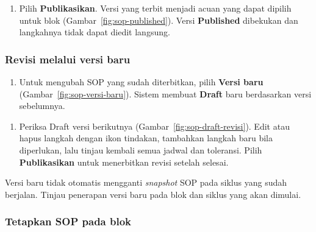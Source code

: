 
\begin{enumerate}[resume=admin-sop]
  \item Pilih \textbf{Publikasikan}. Versi yang terbit menjadi acuan yang dapat dipilih untuk blok (Gambar~\ref{fig:sop-published}). Versi \textbf{Published} dibekukan dan langkahnya tidak dapat diedit langsung.
\end{enumerate}


\subsubsection{Revisi melalui versi baru}

\begin{enumerate}[resume=admin-sop]
  \item Untuk mengubah SOP yang sudah diterbitkan, pilih \textbf{Versi baru} (Gambar~\ref{fig:sop-versi-baru}). Sistem membuat \textbf{Draft} baru berdasarkan versi sebelumnya.
\end{enumerate}


\begin{enumerate}[resume=admin-sop]
  \item Periksa Draft versi berikutnya (Gambar~\ref{fig:sop-draft-revisi}). Edit atau hapus langkah dengan ikon tindakan, tambahkan langkah baru bila diperlukan, lalu tinjau kembali semua jadwal dan toleransi. Pilih \textbf{Publikasikan} untuk menerbitkan revisi setelah selesai.
\end{enumerate}


Versi baru tidak otomatis mengganti \emph{snapshot} SOP pada siklus yang sudah berjalan. Tinjau penerapan versi baru pada blok dan siklus yang akan dimulai.

\subsubsection{Tetapkan SOP pada blok}

